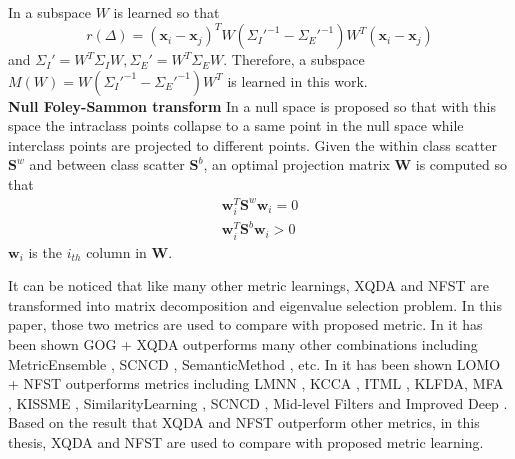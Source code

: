 In \cite{LOMO} a subspace $W$ is learned so that 
\begin{equation}
r(\Delta) = (\bm{x}_i - \bm{x}_j)^TW({\Sigma_I}'^{-1} - {\Sigma_E}'^{-1})W^T(\bm{x}_i - \bm{x}_j)
\end{equation}
and ${\Sigma_I}' = W^T\Sigma_IW, {\Sigma_E}' = W^T\Sigma_EW$. Therefore, a subspace $M(W) = W({\Sigma_I}'^{-1} - {\Sigma_E}'^{-1})W^T$ is learned in this work.\\
\indent \textbf{Null Foley-Sammon transform} In \cite{NFST} a null space is proposed so that with this space the intraclass points collapse to a same point in the null space while interclass points are projected to different points. Given the within class scatter $\bm{S}^w$ and between class scatter $\bm{S}^b$, an optimal projection matrix $\bm{W}$ is computed so that 
\begin{equation}
\begin{aligned}
\bm{w}_i^T\bm{S}^w\bm{w}_i = 0\\
\bm{w}_i^T\bm{S}^b\bm{w}_i > 0
\end{aligned}
\end{equation}
$\bm{w}_i$ is the $i_{th}$ column in $\bm{W}$.

It can be noticed that like many other metric learnings, XQDA and NFST are transformed into matrix decomposition and eigenvalue selection problem. In this paper, those two metrics are used to compare with proposed metric. In \cite{GOG} it has been shown GOG + XQDA outperforms many other combinations including MetricEnsemble \cite{MetricEnsembles}, SCNCD \cite{SCNCD}, SemanticMethod \cite{SemanticMethod}, etc. In \cite{ NFST} it has been shown LOMO + NFST outperforms metrics including LMNN \cite{LMNN}, KCCA \cite{KCCA}, ITML \cite{ITML}, KLFDA\cite{KLFDA}, MFA \cite{KernelVersionMetrics}, KISSME \cite{KISSME}, SimilarityLearning \cite{SimilarityLearning}, SCNCD \cite{SCNCD}, Mid-level Filters \cite{MidlevelFilters} and Improved Deep \cite{ImprovedCNN}. Based on the result that XQDA and NFST outperform other metrics, in this thesis, XQDA and NFST are used to compare with proposed metric learning. 



